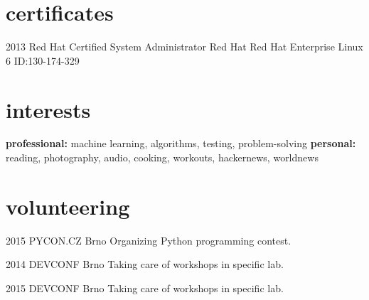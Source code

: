 \documentclass[]{friggeri-cv} %
\begin{document}

\section{certificates}

\begin{entrylist}


\entry
{2013}
{Red Hat Certified System Administrator}
{Red Hat}
{Red Hat Enterprise Linux 6 ID:130-174-329}


\end{entrylist}


\section{interests}

\textbf{professional:} machine learning, algorithms, testing, problem-solving \textbf{personal:} reading, photography, audio, cooking, workouts, hackernews, worldnews


\section{volunteering}

\begin{entrylist}

\entry
{2015}
{PYCON.CZ}
{Brno}
{Organizing Python programming contest.}

\entry
{2014}
{DEVCONF}
{Brno}
{Taking care of workshops in specific lab.}

\entry
{2015}
{DEVCONF}
{Brno}
{Taking care of workshops in specific lab.}
\end{entrylist}

\end{document}
